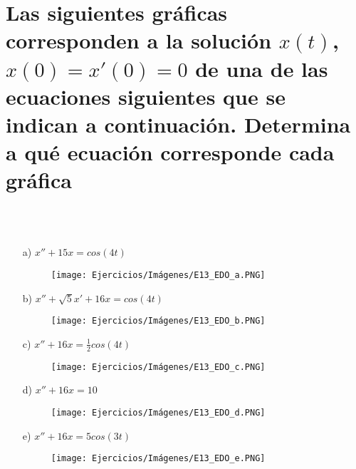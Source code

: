 \section{Las siguientes gráficas corresponden a la solución $x(t)$, $x(0) = x'(0) = 0$ de una de las ecuaciones siguientes que se indican a continuación. Determina a qué ecuación corresponde cada gráfica}
\\
\\
\begin{itemize}
    \item[a)] $x'' + 15x = cos\left(4t \right)$
        \\
        \begin{figure}[h]
            \texttt{[image: Ejercicios/Imágenes/E13\_EDO\_a.PNG]}
            \centering
        \end{figure}
    \item[b)] $x'' + \sqrt{5}x' + 16x = cos\left(4t \right)$
        \\
        \begin{figure}[h]
            \texttt{[image: Ejercicios/Imágenes/E13\_EDO\_b.PNG]}
            \centering
        \end{figure}
    \item[c)] $x'' + 16x = \frac{1}{2}cos\left(4t \right)$
        \\
        \begin{figure}[h]
            \texttt{[image: Ejercicios/Imágenes/E13\_EDO\_c.PNG]}
            \centering
        \end{figure}
    \item[d)] $x'' + 16x = 10$
        \\
        \begin{figure}[h]
            \texttt{[image: Ejercicios/Imágenes/E13\_EDO\_d.PNG]}
            \centering
        \end{figure}
    \item[e)] $x'' + 16x = 5cos\left(3t \right)$
        \\
        \begin{figure}[h]
            \texttt{[image: Ejercicios/Imágenes/E13\_EDO\_e.PNG]}
            \centering
        \end{figure}
\end{itemize}